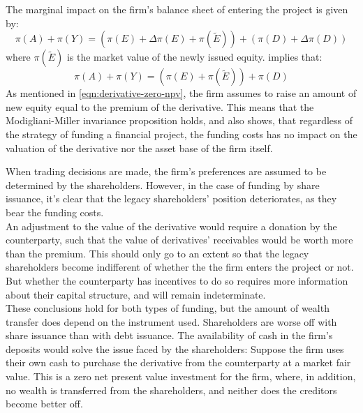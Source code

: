 \documentclass[main.tex]{subfiles}
\begin{document}
        The marginal impact on the firm's balance sheet of entering the project is given by:
        \begin{equation}
            \pi(A) + \pi(Y) = (\pi(E) + \Delta \pi(E) + \pi(\tilde{E})) + (\pi(D) + \Delta \pi(D))
        \end{equation}
        where $\pi(\tilde{E})$ is the market value of the newly issued equity. 
         implies that:
        \begin{equation}
            \pi(A) + \pi(Y) = (\pi(E) + \pi(\tilde{E})) + \pi(D)
        \end{equation}
        As mentioned in \cref{eqn:derivative-zero-npv}, the firm assumes to raise an amount of new equity equal to the premium of the derivative. 
        This means that the Modigliani-Miller invariance proposition holds, and also shows, that regardless of the strategy of funding a financial project, the funding costs has no impact on the valuation of the derivative nor the asset base of the firm itself.

        When trading decisions are made, the firm's preferences are assumed to be determined by the shareholders.
        However, in the case of funding by share issuance, it's clear that the legacy shareholders' position deteriorates, as they bear the funding costs.\\
        An adjustment to the value of the derivative would require a donation by the counterparty, such that the value of derivatives' receivables would be worth more than the premium.
        This should only go to an extent so that the legacy shareholders become indifferent of whether the the firm enters the project or not.
        But whether the counterparty has incentives to do so requires more information about their capital structure, and will remain indeterminate.\\
        These conclusions hold for both types of funding, but the amount of wealth transfer does depend on the instrument used. Shareholders are worse off with share issuance than with debt issuance.
        The availability of cash in the firm's deposits would solve the issue faced by the shareholders:
        Suppose the firm uses their own cash to purchase the derivative from the counterparty at a market fair value.
        This is a zero net present value investment for the firm, where, in addition, no wealth is transferred from the shareholders, and neither does the creditors become better off. 
\end{document}
